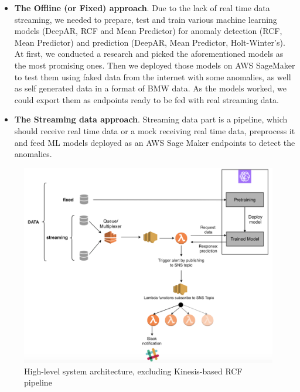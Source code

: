 \begin{itemize}
    \item \textbf{The Offline (or Fixed) approach}. Due to the lack of real time data streaming, we needed to prepare, test and train various machine learning models (DeepAR, RCF and Mean Predictor) for anomaly detection (RCF, Mean Predictor) and prediction (DeepAR, Mean Predictor, Holt-Winter's). At first, we conducted a research and picked the aforementioned models as the most promising ones.
    Then we deployed those models on AWS SageMaker to test them using faked data from the internet with some anomalies, as well as self generated data in a format of BMW data. As the models worked, we could export them as endpoints ready to be fed with real streaming data.
    
    \item \textbf{The Streaming data approach}. Streaming data part is a pipeline, which should receive real time data or a mock receiving real time data, preprocess it and feed ML models deployed as an AWS Sage Maker endpoints to detect the anomalies.
\end{itemize}

\begin{figure}[h]
    \centering
    \includegraphics[width=1\textwidth]{images/sys-architecture.png}
    \caption{High-level system architecture, excluding Kinesis-based RCF pipeline}
    \label{fig:architecture}
\end{figure}
    
